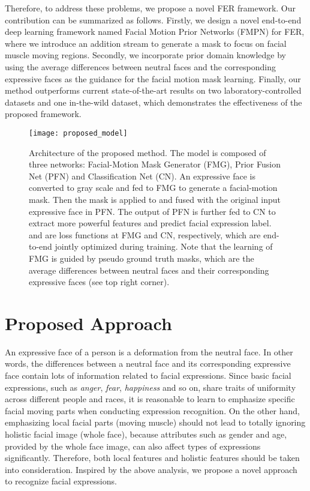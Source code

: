 \documentclass[conference,a4paper]{IEEEtran}
\begin{document}
Therefore, to address these problems, we propose a novel FER framework. Our contribution can be summarized as follows. Firstly, we design a novel end-to-end deep learning framework
named Facial Motion Prior Networks (FMPN) for FER, where we introduce an addition stream to generate a mask to focus on facial muscle moving regions. Secondly, 
we incorporate prior domain knowledge by using the average differences between neutral faces and the corresponding expressive faces as the guidance for the facial motion mask learning.
Finally, our method outperforms current state-of-the-art results
on two laboratory-controlled datasets and one in-the-wild dataset, which demonstrates the effectiveness of the proposed framework.








\begin{figure*}[t!]
    \centering
    \texttt{[image: proposed\_model]}
    \caption{Architecture of the proposed method. The model is composed of three networks: Facial-Motion Mask Generator (FMG), Prior Fusion Net (PFN) and Classification Net (CN). An expressive face is converted to gray scale and fed to FMG to generate a facial-motion mask. Then the mask is applied to and fused with the original input expressive face in PFN. The output of PFN is further fed to CN to extract more powerful features and predict facial expression label.  and  are loss functions at FMG and CN, respectively, which are end-to-end jointly optimized during training. Note that the learning of FMG is guided by pseudo ground truth masks, which are the average differences between neutral faces and their corresponding expressive faces (see top right corner).} \label{fig:proposed_model}
\end{figure*}

\section{Proposed Approach}
An expressive face of a person is a deformation from the neutral face. In other words, the differences between a neutral face and its corresponding expressive face contain lots of information related to facial expressions. Since basic facial expressions, such as \textit{anger}, \textit{fear}, \textit{happiness} and so on, share traits of uniformity across different people and races, it is reasonable to learn to emphasize specific facial moving parts when conducting expression recognition. On the other hand, emphasizing local facial parts (moving muscle) should not lead to totally ignoring holistic facial image (whole face),  because attributes such as gender and age, provided by the whole face image, can also affect types of expressions significantly. Therefore, both local features and holistic features should be taken into consideration. Inspired by the above analysis, we propose a novel approach to recognize facial expressions.
\end{document}
